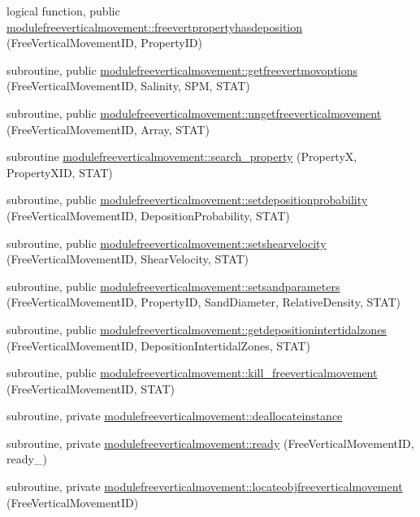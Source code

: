 \begin{DoxyCompactItemize}
\item 
logical function, public \mbox{\hyperlink{namespacemodulefreeverticalmovement_a5df00d9a684664131c8c007872e866a8}{modulefreeverticalmovement\+::freevertpropertyhasdeposition}} (Free\+Vertical\+Movement\+ID, Property\+ID)
\item 
subroutine, public \mbox{\hyperlink{namespacemodulefreeverticalmovement_aeb0cb26f03549d5f06df5b4559b58017}{modulefreeverticalmovement\+::getfreevertmovoptions}} (Free\+Vertical\+Movement\+ID, Salinity, S\+PM, S\+T\+AT)
\item 
subroutine, public \mbox{\hyperlink{namespacemodulefreeverticalmovement_a0dee0aecf95b688c425cff9d35e998aa}{modulefreeverticalmovement\+::ungetfreeverticalmovement}} (Free\+Vertical\+Movement\+ID, Array, S\+T\+AT)
\item 
subroutine \mbox{\hyperlink{namespacemodulefreeverticalmovement_a7533a239e57263d95d53d832615113be}{modulefreeverticalmovement\+::search\+\_\+property}} (PropertyX, Property\+X\+ID, S\+T\+AT)
\item 
subroutine, public \mbox{\hyperlink{namespacemodulefreeverticalmovement_af516e84df0a0267e1305aeeba0e3d131}{modulefreeverticalmovement\+::setdepositionprobability}} (Free\+Vertical\+Movement\+ID, Deposition\+Probability, S\+T\+AT)
\item 
subroutine, public \mbox{\hyperlink{namespacemodulefreeverticalmovement_a09fc990d2d2ac27c1577ca26d525281a}{modulefreeverticalmovement\+::setshearvelocity}} (Free\+Vertical\+Movement\+ID, Shear\+Velocity, S\+T\+AT)
\item 
subroutine, public \mbox{\hyperlink{namespacemodulefreeverticalmovement_a9259d59598e55228b4b8a0ac729e3373}{modulefreeverticalmovement\+::setsandparameters}} (Free\+Vertical\+Movement\+ID, Property\+ID, Sand\+Diameter, Relative\+Density, S\+T\+AT)
\item 
subroutine, public \mbox{\hyperlink{namespacemodulefreeverticalmovement_a7aea36a1bc080954215034040adc4468}{modulefreeverticalmovement\+::getdepositionintertidalzones}} (Free\+Vertical\+Movement\+ID, Deposition\+Intertidal\+Zones, S\+T\+AT)
\item 
subroutine, public \mbox{\hyperlink{namespacemodulefreeverticalmovement_a73edd544e82908b2861ea9c544516ab3}{modulefreeverticalmovement\+::kill\+\_\+freeverticalmovement}} (Free\+Vertical\+Movement\+ID, S\+T\+AT)
\item 
subroutine, private \mbox{\hyperlink{namespacemodulefreeverticalmovement_a336eabf740dc9afccbeae27f1bd4c8f4}{modulefreeverticalmovement\+::deallocateinstance}}
\item 
subroutine, private \mbox{\hyperlink{namespacemodulefreeverticalmovement_a6822a6ac8c2596feb6110b6fa936b42b}{modulefreeverticalmovement\+::ready}} (Free\+Vertical\+Movement\+ID, ready\+\_\+)
\item 
subroutine, private \mbox{\hyperlink{namespacemodulefreeverticalmovement_a5b77a0a606cd82e8b48959c866cc4029}{modulefreeverticalmovement\+::locateobjfreeverticalmovement}} (Free\+Vertical\+Movement\+ID)
\end{DoxyCompactItemize}
